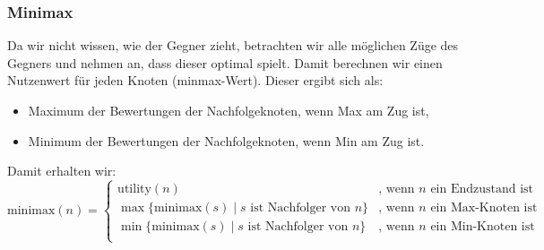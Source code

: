 \subsubsection{Minimax}
Da wir nicht wissen, wie der Gegner zieht, betrachten wir alle möglichen Züge des Gegners und nehmen an, dass dieser optimal spielt. Damit berechnen wir einen Nutzenwert für jeden Knoten (minmax-Wert). Dieser ergibt sich als:
\begin{itemize}
\item Maximum der Bewertungen der Nachfolgeknoten, wenn Max am Zug ist,
\item Minimum der Bewertungen der Nachfolgeknoten, wenn Min am Zug ist.
\end{itemize}
Damit erhalten wir:
$$ \mathrm{minimax}(n) =\begin{cases}
\mathrm{utility}(n) & \text{, wenn }n \text{ ein Endzustand ist}\\
\max\{ \mathrm{minimax}(s)\;|\; s \text{ ist Nachfolger von }n\} & \text{, wenn }n \text{ ein Max-Knoten ist}\\
\min\{ \mathrm{minimax}(s)\;|\; s \text{ ist Nachfolger von }n\} & \text{, wenn }n \text{ ein Min-Knoten ist}\\
\end{cases} $$
\begin{center}
 \quad
{}
\end{center}

